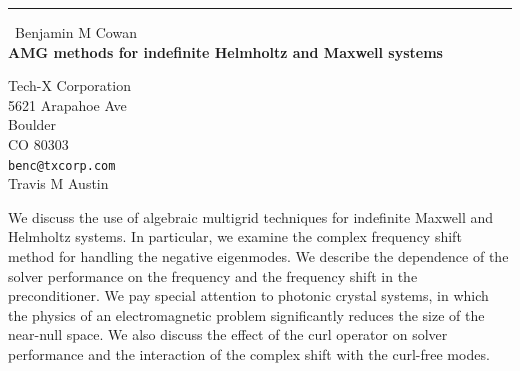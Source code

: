 \documentclass{report}
\begin{document}
\begin{center}
\rule{6in}{1pt} \
{\large Benjamin M Cowan \\
{\bf AMG methods for indefinite Helmholtz and Maxwell systems}}

Tech-X Corporation \\ 5621 Arapahoe Ave \\ Boulder \\ CO 80303
\\
{\tt benc@txcorp.com}\\
Travis M Austin\end{center}

We discuss the use of algebraic multigrid techniques for indefinite
Maxwell and Helmholtz systems. In particular, we examine the complex
frequency shift method for handling the negative eigenmodes. We describe
the dependence of the solver performance on the frequency and the
frequency shift in the preconditioner. We pay special attention to
photonic crystal systems, in which the physics of an electromagnetic
problem significantly reduces the size of the near-null space. We also
discuss the effect of the curl operator on solver performance and the
interaction of the complex shift with the curl-free modes.
\end{document}
